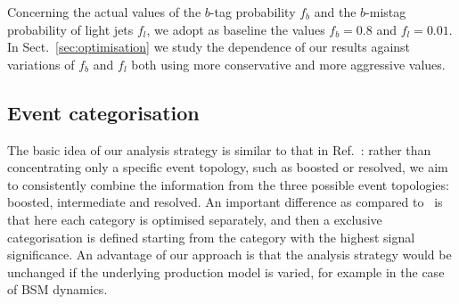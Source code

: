 Concerning the actual values of the $b$-tag probability $f_b$ and
the $b$-mistag probability of light jets $f_l$, 
we adopt as baseline the values $f_b=0.8$ and $f_l=0.01$.
%
In Sect.~\ref{sec:optimisation} we study the dependence of
our results against variations of $f_b$ and $f_l$ both
using more conservative and more aggressive values.
%

\subsection{Event categorisation}
\label{sec:categorisation}

The basic idea of our analysis strategy is similar to that in Ref.~\cite{Gouzevitch:2013qca}:
rather than concentrating only a specific event topology, such as boosted
or resolved, we aim to consistently combine the information from
the three possible event topologies: boosted, intermediate and
resolved.
%
An important difference as compared to~\cite{Gouzevitch:2013qca}
is that here each category is optimised separately, and then
a exclusive categorisation is defined starting from the category
with the highest signal significance.
%
An advantage of our approach is that the analysis strategy would be unchanged
if the underlying production model is varied, for example in the case of
BSM dynamics.

